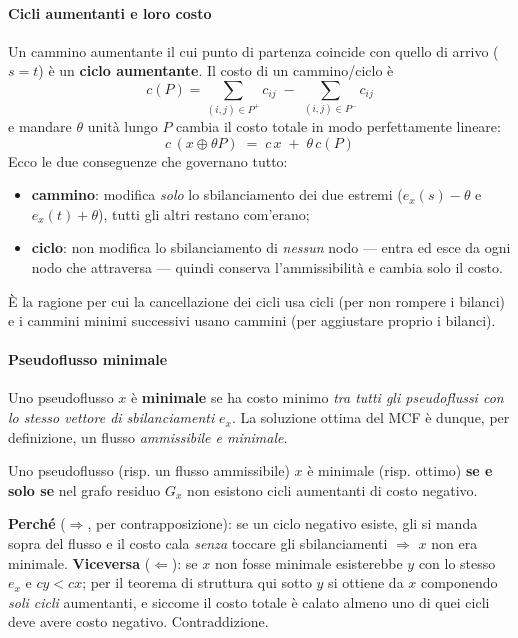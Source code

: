 \documentclass[12pt]{extarticle} %
\begin{document}
\paragraph{Cicli aumentanti e loro costo}
Un cammino aumentante il cui punto di partenza coincide con quello di arrivo ($s = t$) è un \textbf{ciclo aumentante}. Il costo di un cammino/ciclo è
\[
c(P) = \sum_{(i,j)\in P^+} c_{ij} \;-\; \sum_{(i,j)\in P^-} c_{ij}
\]
e mandare $\theta$ unità lungo $P$ cambia il costo totale in modo perfettamente lineare:
\[
c\,(x \oplus \theta P) \;=\; c\,x \;+\; \theta\, c(P)
\]
Ecco le due conseguenze che governano tutto:
\begin{itemize}
    \item \textbf{cammino}: modifica \emph{solo} lo sbilanciamento dei due estremi ($e_x(s)-\theta$ e $e_x(t)+\theta$), tutti gli altri restano com'erano;
    \item \textbf{ciclo}: non modifica lo sbilanciamento di \emph{nessun} nodo --- entra ed esce da ogni nodo che attraversa --- quindi conserva l'ammissibilità e cambia solo il costo.
\end{itemize}
È la ragione per cui la cancellazione dei cicli usa cicli (per non rompere i bilanci) e i cammini minimi successivi usano cammini (per aggiustare proprio i bilanci).

\paragraph{Pseudoflusso minimale}
Uno pseudoflusso $x$ è \textbf{minimale} se ha costo minimo \emph{tra tutti gli pseudoflussi con lo stesso vettore di sbilanciamenti} $e_x$. La soluzione ottima del MCF è dunque, per definizione, un flusso \emph{ammissibile e minimale}.
\begin{tcolorbox}[colback=gray!6, colframe=black!60, title=\textbf{Lemma fondamentale (condizione di ottimo)}]
Uno pseudoflusso (risp. un flusso ammissibile) $x$ è minimale (risp. ottimo) \textbf{se e solo se} nel grafo residuo $G_x$ non esistono cicli aumentanti di costo negativo.
\end{tcolorbox}
\noindent \textbf{Perché} ($\Rightarrow$, per contrapposizione): se un ciclo negativo esiste, gli si manda sopra del flusso e il costo cala \emph{senza} toccare gli sbilanciamenti $\Rightarrow$ $x$ non era minimale. \textbf{Viceversa} ($\Leftarrow$): se $x$ non fosse minimale esisterebbe $y$ con lo stesso $e_x$ e $cy < cx$; per il teorema di struttura qui sotto $y$ si ottiene da $x$ componendo \emph{soli cicli} aumentanti, e siccome il costo totale è calato almeno uno di quei cicli deve avere costo negativo. Contraddizione.
\end{document}
